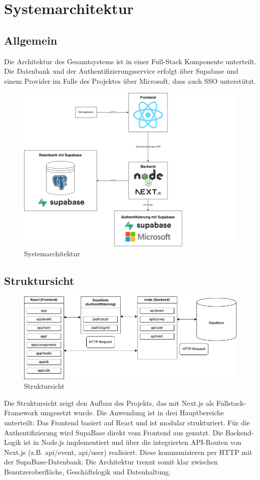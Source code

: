 \documentclass[a4paper,12pt]{article}
\begin{document}
\section{Systemarchitektur}
\subsection{Allgemein}
Die Architektur des Gesamtsystems ist in einer Full-Stack Komponente unterteilt. Die Datenbank und der Authentifizierungsservice erfolgt über Supabase und einem Provider im Falle des Projektes über Microsoft, dass auch SSO unterstützt.
\begin{figure}[h]
  \centering
  \includegraphics[width=1\textwidth]{Abbildungen/Systemarchitektur.png}
  \caption{Systemarchitektur}
  \label{fig:systemarchitektur}
\end{figure}
\newpage
\subsection{Struktursicht}
\begin{figure}[H]
  \centering
  \includegraphics[width=1\textwidth]{Abbildungen/struktursicht.png}
  \caption{Struktursicht}
  \label{fig:struktursicht}
\end{figure}
Die Struktursicht zeigt den Aufbau des Projekts, das mit Next.js als Fullstack-Framework umgesetzt wurde. Die Anwendung ist in drei Hauptbereiche unterteilt: Das Frontend basiert auf React und ist modular strukturiert. Für die Authentifizierung wird SupaBase direkt vom Frontend aus genutzt. Die Backend-Logik ist in Node.js implementiert und über die integrierten API-Routen von Next.js (z.B. api/event, api/user) realisiert. Diese kommunizieren per HTTP mit der SupaBase-Datenbank. Die Architektur trennt somit klar zwischen Benutzeroberfläche, Geschäftslogik und Datenhaltung.
\end{document}
